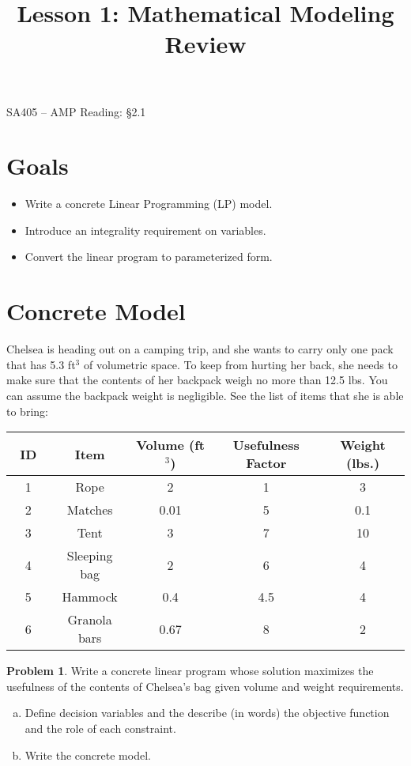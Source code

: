 \documentclass[12pt]{article}
\makeatletter
\theoremstyle{definition}
\newtheorem{problem}{Problem}
\newcommand{\graphbox}[5]%
{
\begin{tikzpicture}
     [>=latex,scale=#5]
     
     \draw [->,very thick] (#1, 0) -- (#2, 0) node[right] {$x$};
     \draw [->,very thick] (0, #3) -- (0, #4) node[above] {$y$};
     
     \draw[step=1cm,thick,dotted] (#1,#3) grid (#2,#4);
   \end{tikzpicture}
   }
\renewcommand{\maketitle}{
  \noindent SA405 -- AMP \hfill  Reading: \S 2.1 \\

  \begin{center}\Large{\textbf{\@title}}\end{center}
}
\makeatother
\begin{document}

\title{Lesson 1:  Mathematical Modeling Review}


\maketitle

\section{Goals}
\begin{itemize}
\item  Write a concrete Linear Programming (LP) model.
\item  Introduce an integrality requirement on variables.
\item  Convert the linear program to parameterized form.
\end{itemize}

\section{Concrete Model}

Chelsea is heading out on a camping trip, and she wants to carry only one pack that has 5.3 ft$^3$ of volumetric space. To keep from hurting her back, she needs to make sure that the contents of her backpack weigh no more than 12.5 lbs. You can assume the backpack weight is negligible. See the list of items that she is able to bring:


\begin{center}
\begin{tabular}{|c|c |c| c| c|}
\hline
~ID~ & Item & Volume (ft$^3$) & Usefulness Factor & Weight (lbs.)\\ \hline
1 & Rope & 2 & 1 & 3 \\ \hline
2 & Matches & 0.01 & 5 & 0.1 \\  \hline
3 & Tent & 3 & 7 & 10   \\ \hline
4 & Sleeping bag & 2 & 6 & 4   \\ \hline
5 & Hammock & 0.4 & 4.5 & 4   \\ \hline
6 & Granola bars & 0.67 & 8 & 2   \\ \hline
\end{tabular}
\end{center}

\begin{problem}  Write a concrete linear program whose solution maximizes the usefulness of the contents of Chelsea's bag given volume and weight requirements.

\begin{enumerate}[a)]
\item Define decision variables and the describe (in words) the objective function and the role of each constraint. 

\pagebreak

\item Write the concrete model.
\end{enumerate}
\end{problem}
\end{document}
